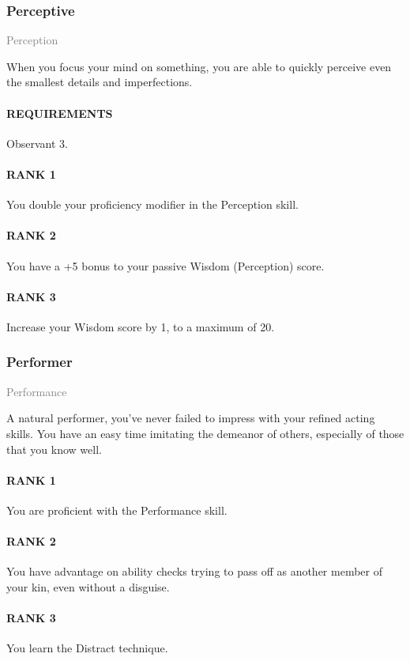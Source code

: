 \subsubsection{Perceptive} \label{feat::perceptive}
\small{\textcolor{gray}{Perception}}

\normalsize
When you focus your mind on something, you are able to quickly perceive even the smallest details and imperfections.
\paragraph{REQUIREMENTS} Observant 3.
\paragraph{RANK 1} You double your proficiency modifier in the Perception skill.
\paragraph{RANK 2} You have a +5 bonus to your passive Wisdom (Perception) score.
\paragraph{RANK 3} Increase your Wisdom score by 1, to a maximum of 20.

\subsubsection{Performer} \label{feat::performer}
\small{\textcolor{gray}{Performance}}

\normalsize
A natural performer, you've never failed to impress with your refined acting skills.
You have an easy time imitating the demeanor of others, especially of those that you know well.
\paragraph{RANK 1} You are proficient with the Performance skill.
\paragraph{RANK 2} You have advantage on ability checks trying to pass off as another member of your kin, even without a disguise.
\paragraph{RANK 3} You learn the Distract technique.

